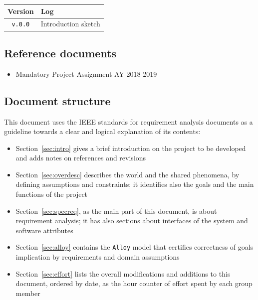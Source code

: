 \documentclass[12pt]{article}
\begin{document}
    \begin{table}[h]
      \begin{tabular}{|c|l|}
        \hline
        \textbf{Version}                & \textbf{Log} \\ \hline
        \texttt{v.0.0} &
          Introduction sketch
        \\ \hline
      \end{tabular}
    \end{table}

  \subsection{Reference documents}

    \begin{itemize}
      \item Mandatory Project Assignment AY 2018-2019
    \end{itemize}

  \subsection{Document structure}

    This document uses the IEEE standards for requirement analysis documents as a guideline towards a clear and logical explanation of its contents:
    \begin{itemize}
      \item Section~\ref{sec:intro} gives a brief introduction on the project to be developed and adds notes on references and revisions
      \item Section~\ref{sec:overdesc} describes the world and the shared phenomena, by defining assumptions and constraints; it identifies also the goals and the main functions of the project
      \item Section~\ref{sec:specreq}, as the main part of this document, is about requirement analysis; it has also sections about interfaces of the system and software attributes
      \item Section~\ref{sec:alloy} contains the \texttt{Alloy} model that certifies correctness of goals implication by requirements and domain assumptions
      \item Section~\ref{sec:effort} lists the overall modifications and additions to this document, ordered by date, as the hour counter of effort spent by each group member
    \end{itemize}

\clearpage
\end{document}
